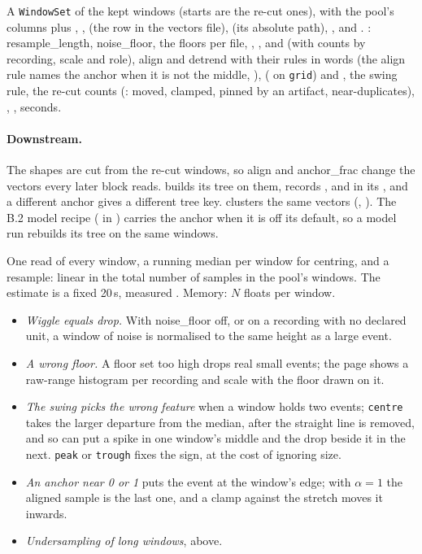 A \texttt{WindowSet} of the kept windows (starts are the re-cut ones), with the pool's columns
plus , ,  (the row in the
vectors file),  (its absolute path), ,
 and . : resample\_length, noise\_floor,
the floors per file, , ,  and  (with
counts by recording, scale and role), align and detrend with their rules in words (the align
rule names the anchor when it is not the middle, ), 
( on \texttt{grid}) and , the swing rule, the re-cut counts
(: moved, clamped, pinned by an artifact, near-duplicates), ,
, seconds.

\paragraph{Downstream.} The shapes are cut from the re-cut windows, so align and anchor\_frac
change the vectors every later block reads.  builds its tree
on them, records ,  and  in its , and a
different anchor gives a different tree key.  clusters the
same vectors (, ). The B.2 model recipe
( in ) carries the anchor when it is
off its default, so a model run rebuilds its tree on the same windows.

One read of every window, a running median per window for centring, and a resample: linear in
the total number of samples in the pool's windows. The estimate is a fixed 20\,s, measured
. Memory: $N$ floats per
window.

\begin{itemize}
\item \emph{Wiggle equals drop.} With noise\_floor off, or on a recording with no declared unit,
  a window of noise is normalised to the same height as a large event.
\item \emph{A wrong floor.} A floor set too high drops real small events; the page shows a
  raw-range histogram per recording and scale with the floor drawn on it.
\item \emph{The swing picks the wrong feature} when a window holds two events; \texttt{centre}
  takes the larger departure from the median, after the straight line is removed, and so can
  put a spike in one window's middle and the drop beside it in the next. \texttt{peak} or
  \texttt{trough} fixes the sign, at the cost of ignoring size.
\item \emph{An anchor near 0 or 1} puts the event at the window's edge; with $\alpha = 1$ the
  aligned sample is the last one, and a clamp against the stretch moves it inwards.
\item \emph{Undersampling of long windows}, above.
\end{itemize}


